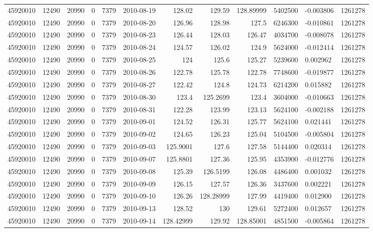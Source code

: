 \begin{tabular}{l | r | r | r | r | l | r | r | r | r | l | r}
45920010 & 12490 & 20990 & 0 & 7379 & 2010-08-19 & 128.02 & 129.59 & 128.89999 & 5402500 & -0.003806 & 1261278 \\
45920010 & 12490 & 20990 & 0 & 7379 & 2010-08-20 & 126.96 & 128.98 & 127.5 & 6246300 & -0.010861 & 1261278 \\
45920010 & 12490 & 20990 & 0 & 7379 & 2010-08-23 & 126.44 & 128.03 & 126.47 & 4034700 & -0.008078 & 1261278 \\
45920010 & 12490 & 20990 & 0 & 7379 & 2010-08-24 & 124.57 & 126.02 & 124.9 & 5624000 & -0.012414 & 1261278 \\
45920010 & 12490 & 20990 & 0 & 7379 & 2010-08-25 & 124 & 125.6 & 125.27 & 5239600 & 0.002962 & 1261278 \\
45920010 & 12490 & 20990 & 0 & 7379 & 2010-08-26 & 122.78 & 125.78 & 122.78 & 7748600 & -0.019877 & 1261278 \\
45920010 & 12490 & 20990 & 0 & 7379 & 2010-08-27 & 122.42 & 124.8 & 124.73 & 6214200 & 0.015882 & 1261278 \\
45920010 & 12490 & 20990 & 0 & 7379 & 2010-08-30 & 123.4 & 125.2699 & 123.4 & 3604000 & -0.010663 & 1261278 \\
45920010 & 12490 & 20990 & 0 & 7379 & 2010-08-31 & 122.28 & 123.99 & 123.13 & 5624100 & -0.002188 & 1261278 \\
45920010 & 12490 & 20990 & 0 & 7379 & 2010-09-01 & 124.52 & 126.31 & 125.77 & 5624100 & 0.021441 & 1261278 \\
45920010 & 12490 & 20990 & 0 & 7379 & 2010-09-02 & 124.65 & 126.23 & 125.04 & 5104500 & -0.005804 & 1261278 \\
45920010 & 12490 & 20990 & 0 & 7379 & 2010-09-03 & 125.9001 & 127.6 & 127.58 & 5144400 & 0.020314 & 1261278 \\
45920010 & 12490 & 20990 & 0 & 7379 & 2010-09-07 & 125.8801 & 127.36 & 125.95 & 4353900 & -0.012776 & 1261278 \\
45920010 & 12490 & 20990 & 0 & 7379 & 2010-09-08 & 125.39 & 126.5199 & 126.08 & 4486400 & 0.001032 & 1261278 \\
45920010 & 12490 & 20990 & 0 & 7379 & 2010-09-09 & 126.15 & 127.57 & 126.36 & 3437600 & 0.002221 & 1261278 \\
45920010 & 12490 & 20990 & 0 & 7379 & 2010-09-10 & 126.26 & 128.28999 & 127.99 & 4419400 & 0.012900 & 1261278 \\
45920010 & 12490 & 20990 & 0 & 7379 & 2010-09-13 & 128.52 & 130 & 129.61 & 5272400 & 0.012657 & 1261278 \\
45920010 & 12490 & 20990 & 0 & 7379 & 2010-09-14 & 128.42999 & 129.92 & 128.85001 & 4851500 & -0.005864 & 1261278 \\

\end{tabular}
